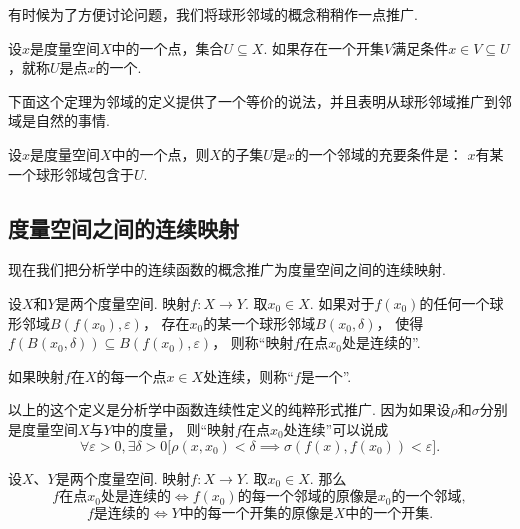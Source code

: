 有时候为了方便讨论问题，我们将球形邻域的概念稍稍作一点推广.
\begin{definition}\label{definition:度量空间.邻域的概念}
设\(x\)是度量空间\(X\)中的一个点，集合\(U \subseteq X\).
如果存在一个开集\(V\)满足条件\(x \in V \subseteq U\)，就称\(U\)是点\(x\)的一个.
\end{definition}
下面这个定理为邻域的定义提供了一个等价的说法，并且表明从球形邻域推广到邻域是自然的事情.
\begin{theorem}
设\(x\)是度量空间\(X\)中的一个点，则\(X\)的子集\(U\)是\(x\)的一个邻域的充要条件是：
\(x\)有某一个球形邻域包含于\(U\).
\end{theorem}

\subsection{度量空间之间的连续映射}
现在我们把分析学中的连续函数的概念推广为度量空间之间的连续映射.

\begin{definition}\label{definition:度量空间.连续映射的概念}
设\(X\)和\(Y\)是两个度量空间.
映射\(f\colon X \to Y\).
取\(x_0 \in X\).
如果对于\(f(x_0)\)的任何一个球形邻域\(B(f(x_0),\varepsilon)\)，%
存在\(x_0\)的某一个球形邻域\(B(x_0,\delta)\)，%
使得\(f(B(x_0,\delta)) \subseteq B(f(x_0),\varepsilon)\)，%
则称“映射\(f\)在点\(x_0\)处是连续的”.

如果映射\(f\)在\(X\)的每一个点\(x \in X\)处连续，则称“\(f\)是一个”.
\end{definition}
以上的这个定义是分析学中函数连续性定义的纯粹形式推广.
因为如果设\(\rho\)和\(\sigma\)分别是度量空间\(X\)与\(Y\)中的度量，%
则“映射\(f\)在点\(x_0\)处连续”可以说成\[
\forall\varepsilon>0,
\exists\delta>0
\bigl[
\rho(x,x_0)<\delta
\implies
\sigma(f(x),f(x_0))<\varepsilon
\bigr].
\]

\begin{theorem}\label{theorem:度量空间.度量空间下的连续映射与邻域的联系}
设\(X\)、\(Y\)是两个度量空间.
映射\(f\colon X \to Y\).
取\(x_0 \in X\).
那么\[
\text{\(f\)在点\(x_0\)处是连续的}
\iff
\text{\(f(x_0)\)的每一个邻域的原像是\(x_0\)的一个邻域},
\]\[
\text{\(f\)是连续的}
\iff
\text{\(Y\)中的每一个开集的原像是\(X\)中的一个开集}.
\]
\end{theorem}


\begingroup
\def\T{\mathfrak T}%
\def\oT{\overline{\mathfrak T}}%


